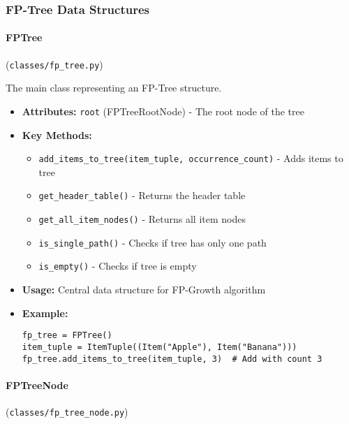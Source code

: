 \documentclass[
english,
smallborders
]{i6prcsht}
\begin{document}
\vspace*{0.3cm}

\vspace*{0.5cm}

\subsubsection*{FP-Tree Data Structures}

\paragraph{FPTree} (\texttt{classes/fp\_tree.py})

The main class representing an FP-Tree structure.

\begin{itemize}
	\item \textbf{Attributes:} \texttt{root} (FPTreeRootNode) - The root node of the tree
	\item \textbf{Key Methods:}
	      \begin{itemize}
		      \item \texttt{add\_items\_to\_tree(item\_tuple, occurrence\_count)} - Adds items to tree
		      \item \texttt{get\_header\_table()} - Returns the header table
		      \item \texttt{get\_all\_item\_nodes()} - Returns all item nodes
		      \item \texttt{is\_single\_path()} - Checks if tree has only one path
		      \item \texttt{is\_empty()} - Checks if tree is empty
	      \end{itemize}
	\item \textbf{Usage:} Central data structure for FP-Growth algorithm
	\item \textbf{Example:}
	      \begin{lstlisting}
fp_tree = FPTree()
item_tuple = ItemTuple((Item("Apple"), Item("Banana")))
fp_tree.add_items_to_tree(item_tuple, 3)  # Add with count 3
    \end{lstlisting}
\end{itemize}

\vspace*{0.3cm}

\paragraph{FPTreeNode} (\texttt{classes/fp\_tree\_node.py})
\end{document}
